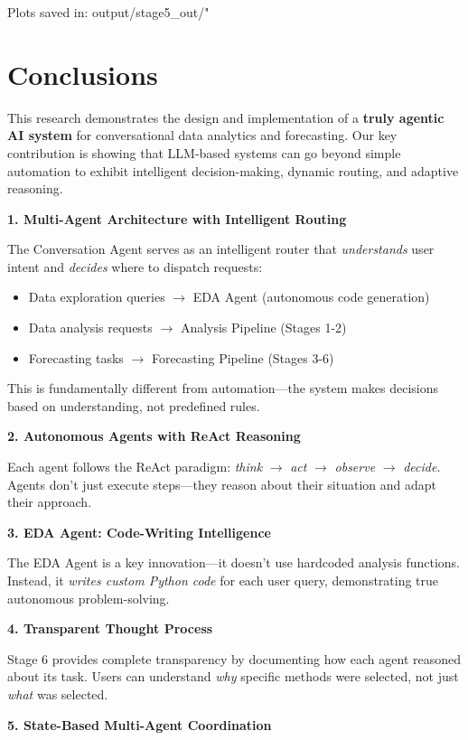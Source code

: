 \documentclass[11pt,a4paper]{article}
\begin{document}
Plots saved in: output/stage5\_out/"

\section{Conclusions}

This research demonstrates the design and implementation of a \textbf{truly agentic AI system} for conversational data analytics and forecasting. Our key contribution is showing that LLM-based systems can go beyond simple automation to exhibit intelligent decision-making, dynamic routing, and adaptive reasoning.

\textbf{1. Multi-Agent Architecture with Intelligent Routing}

The Conversation Agent serves as an intelligent router that \textit{understands} user intent and \textit{decides} where to dispatch requests:
\begin{itemize}
    \item Data exploration queries $\rightarrow$ EDA Agent (autonomous code generation)
    \item Data analysis requests $\rightarrow$ Analysis Pipeline (Stages 1-2)
    \item Forecasting tasks $\rightarrow$ Forecasting Pipeline (Stages 3-6)
\end{itemize}

This is fundamentally different from automation---the system makes decisions based on understanding, not predefined rules.

\textbf{2. Autonomous Agents with ReAct Reasoning}

Each agent follows the ReAct paradigm: \textit{think} $\rightarrow$ \textit{act} $\rightarrow$ \textit{observe} $\rightarrow$ \textit{decide}. Agents don't just execute steps---they reason about their situation and adapt their approach.

\textbf{3. EDA Agent: Code-Writing Intelligence}

The EDA Agent is a key innovation---it doesn't use hardcoded analysis functions. Instead, it \textit{writes custom Python code} for each user query, demonstrating true autonomous problem-solving.

\textbf{4. Transparent Thought Process}

Stage 6 provides complete transparency by documenting how each agent reasoned about its task. Users can understand \textit{why} specific methods were selected, not just \textit{what} was selected.

\textbf{5. State-Based Multi-Agent Coordination}
\end{document}
